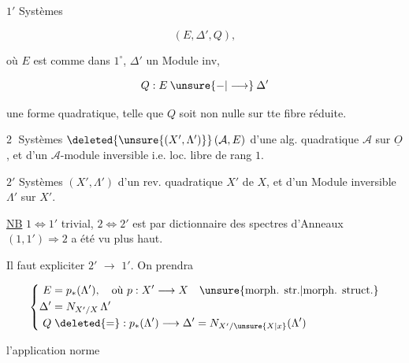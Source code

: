 
\textcircled{$1'$} Systèmes

\[
(E,\Delta',Q),
\]

où $E$ est comme dans $1^\circ$, $\Delta'$ un Module inv,

\[
Q:E\mathbin{\unsure{-|\longrightarrow}}\Delta'
\]

une forme quadratique, telle que $Q$ soit non  nulle sur tte fibre réduite.

\textcircled{2} Systèmes $\deleted{\unsure{(X',\Lambda')}}\,(\mathcal A,E)$ d'une alg. quadratique $\mathcal A$ sur $\underline O$, et d'un $\mathcal A$-module inversible i.e. loc. libre de rang $1$.

\textcircled{$2'$} Systèmes $(X',\Lambda')$ d'un rev. quadratique $X'$ de $X$, et d'un Module inversible $\Lambda'$ sur $X'$.

\uline{NB} $1\Longleftrightarrow1'$ trivial, $2\Longleftrightarrow2'$ est  par dictionnaire des spectres d'Anneaux  $(1,1')\Longrightarrow2$ a été vu plus haut.

Il faut expliciter \textcircled{$2'$} $\longrightarrow$ \textcircled{$1'$}. On prendra

\[
\left\{\begin{aligned}
 E&=p_*(\Lambda'),\quad\text{où }p:X'\longrightarrow X\quad\text{\unsure{morph. str.|morph. struct.}}\\
 \Delta'&=N_{X'/X}\,\Lambda'\\
 Q&\mathrel{\deleted{=}:}p_*(\Lambda')\longrightarrow\Delta'=N_{X'/\unsure{X|x}}(\Lambda')
\end{aligned}\right.
\]

l'application norme
